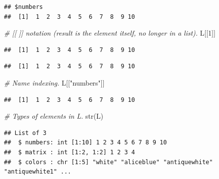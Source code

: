 \documentclass[
]{book}
\newenvironment{Shaded}{\begin{snugshade}}{\end{snugshade}}
\newcommand{\CommentTok}[1]{\textcolor[rgb]{0.56,0.35,0.01}{\textit{#1}}}
\newcommand{\DecValTok}[1]{\textcolor[rgb]{0.00,0.00,0.81}{#1}}
\newcommand{\FunctionTok}[1]{\textcolor[rgb]{0.00,0.00,0.00}{#1}}
\newcommand{\NormalTok}[1]{#1}
\newcommand{\SpecialCharTok}[1]{\textcolor[rgb]{0.00,0.00,0.00}{#1}}
\newcommand{\StringTok}[1]{\textcolor[rgb]{0.31,0.60,0.02}{#1}}
\begin{document}
\begin{verbatim}
## $numbers
##  [1]  1  2  3  4  5  6  7  8  9 10
\end{verbatim}

\begin{Shaded}
\begin{Highlighting}[]
\CommentTok{\# [[ ]] notation (result is the element itself, no longer in a list).}
\NormalTok{L[[}\DecValTok{1}\NormalTok{]]}
\end{Highlighting}
\end{Shaded}

\begin{verbatim}
##  [1]  1  2  3  4  5  6  7  8  9 10
\end{verbatim}

\begin{Shaded}
\end{Shaded}

\begin{verbatim}
##  [1]  1  2  3  4  5  6  7  8  9 10
\end{verbatim}

\begin{Shaded}
\begin{Highlighting}[]
\CommentTok{\# Name indexing.}
\NormalTok{L[[}\StringTok{"numbers"}\NormalTok{]]}
\end{Highlighting}
\end{Shaded}

\begin{verbatim}
##  [1]  1  2  3  4  5  6  7  8  9 10
\end{verbatim}

\begin{Shaded}
\begin{Highlighting}[]
\CommentTok{\# Types of elements in L.}
\FunctionTok{str}\NormalTok{(L)}
\end{Highlighting}
\end{Shaded}

\begin{verbatim}
## List of 3
##  $ numbers: int [1:10] 1 2 3 4 5 6 7 8 9 10
##  $ matrix : int [1:2, 1:2] 1 2 3 4
##  $ colors : chr [1:5] "white" "aliceblue" "antiquewhite" "antiquewhite1" ...
\end{verbatim}
\end{document}
